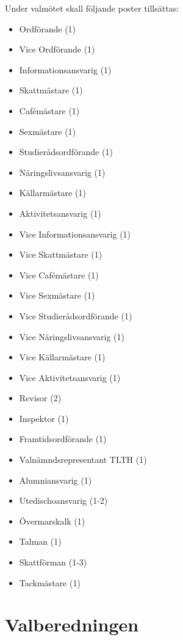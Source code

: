 \documentclass[pdfbookmarks,a4paper,11pt]{article}
\newlength{\itemcollength}
\newenvironment{reglemlista}{%
  \begin{list}{}{%
      \setlength{\labelwidth}{\itemcollength}%
      \setlength{\leftmargin}{\labelwidth + \labelsep}%
      \renewcommand{\makelabel}[1]{%
        \raisebox{0pt}[1ex][0pt]{%
          \makebox[\labelwidth][l]{%
            \parbox[t]{\itemcollength}{%
              \raggedright\hspace{0pt}##1}}}\hfill}%
      }}{%
  \end{list}}
\begin{document}
\begin{reglemlista}
	\item[Valmöte]
	Under valmötet skall följande poster tillsättas:
	\begin{itemize}
		\item Ordförande (1)
		\item Vice Ordförande (1)
		\item Informationsansvarig (1)
		\item Skattmästare (1)
		\item Cafémästare (1)
		\item Sexmästare (1)
		\item Studierådsordförande (1)
		\item Näringslivsansvarig (1)
		\item Källarmästare (1)
		\item Aktivitetsansvarig (1)
		\item Vice Informationsansvarig (1)
		\item Vice Skattmästare (1)
		\item Vice Cafémästare (1)
		\item Vice Sexmästare (1)
		\item Vice Studierådsordförande (1)
		\item Vice Näringslivsansvarig (1)
		\item Vice Källarmästare (1)
		\item Vice Aktivitetsansvarig (1)
		\item Revisor (2)
		\item Inspektor (1)
		\item Framtidsordförande (1)
		\item Valnämndsrepresentant TLTH (1)
		\item Alumniansvarig (1)
		\item Utedischoansvarig (1-2)
		\item Övermarskalk (1)
		\item Talman (1)
		\item Skattförman (1-3)
		\item Tackmästare (1)
	\end{itemize}

\end{reglemlista}

\section{Valberedningen}
\end{document}
